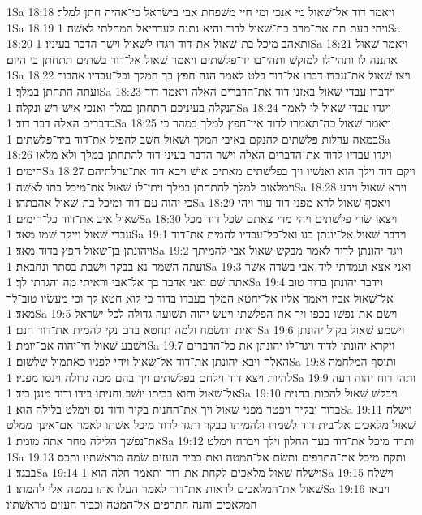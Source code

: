 1Sa 18:18  ויאמר דוד אל־שׁאול מי אנכי ומי חיי משׁפחת אבי בישׂראל כי־אהיה חתן למלך׃
1Sa 18:19  ויהי בעת תת את־מרב בת־שׁאול לדוד והיא נתנה לעדריאל המחלתי לאשׁה׃
1Sa 18:20  ותאהב מיכל בת־שׁאול את־דוד ויגדו לשׁאול וישׁר הדבר בעיניו׃
1Sa 18:21  ויאמר שׁאול אתננה לו ותהי־לו למוקשׁ ותהי־בו יד־פלשׁתים ויאמר שׁאול אל־דוד בשׁתים תתחתן בי היום׃
1Sa 18:22  ויצו שׁאול את־עבדו דברו אל־דוד בלט לאמר הנה חפץ בך המלך וכל־עבדיו אהבוך ועתה התחתן במלך׃
1Sa 18:23  וידברו עבדי שׁאול באזני דוד את־הדברים האלה ויאמר דוד הנקלה בעיניכם התחתן במלך ואנכי אישׁ־רשׁ ונקלה׃
1Sa 18:24  ויגדו עבדי שׁאול לו לאמר כדברים האלה דבר דוד׃
1Sa 18:25  ויאמר שׁאול כה־תאמרו לדוד אין־חפץ למלך במהר כי במאה ערלות פלשׁתים להנקם באיבי המלך ושׁאול חשׁב להפיל את־דוד ביד־פלשׁתים׃
1Sa 18:26  ויגדו עבדיו לדוד את־הדברים האלה וישׁר הדבר בעיני דוד להתחתן במלך ולא מלאו הימים׃
1Sa 18:27  ויקם דוד וילך הוא ואנשׁיו ויך בפלשׁתים מאתים אישׁ ויבא דוד את־ערלתיהם וימלאום למלך להתחתן במלך ויתן־לו שׁאול את־מיכל בתו לאשׁה׃
1Sa 18:28  וירא שׁאול וידע כי יהוה עם־דוד ומיכל בת־שׁאול אהבתהו׃
1Sa 18:29  ויאסף שׁאול לרא מפני דוד עוד ויהי שׁאול איב את־דוד כל־הימים׃
1Sa 18:30  ויצאו שׂרי פלשׁתים ויהי מדי צאתם שׂכל דוד מכל עבדי שׁאול וייקר שׁמו מאד׃
1Sa 19:1  וידבר שׁאול אל־יונתן בנו ואל־כל־עבדיו להמית את־דוד ויהונתן בן־שׁאול חפץ בדוד מאד׃
1Sa 19:2  ויגד יהונתן לדוד לאמר מבקשׁ שׁאול אבי להמיתך ועתה השׁמר־נא בבקר וישׁבת בסתר ונחבאת׃
1Sa 19:3  ואני אצא ועמדתי ליד־אבי בשׂדה אשׁר אתה שׁם ואני אדבר בך אל־אבי וראיתי מה והגדתי לך׃
1Sa 19:4  וידבר יהונתן בדוד טוב אל־שׁאול אביו ויאמר אליו אל־יחטא המלך בעבדו בדוד כי לוא חטא לך וכי מעשׂיו טוב־לך מאד׃
1Sa 19:5  וישׂם את־נפשׁו בכפו ויך את־הפלשׁתי ויעשׂ יהוה תשׁועה גדולה לכל־ישׂראל ראית ותשׂמח ולמה תחטא בדם נקי להמית את־דוד חנם׃
1Sa 19:6  וישׁמע שׁאול בקול יהונתן וישׁבע שׁאול חי־יהוה אם־יומת׃
1Sa 19:7  ויקרא יהונתן לדוד ויגד־לו יהונתן את כל־הדברים האלה ויבא יהונתן את־דוד אל־שׁאול ויהי לפניו כאתמול שׁלשׁום׃
1Sa 19:8  ותוסף המלחמה להיות ויצא דוד וילחם בפלשׁתים ויך בהם מכה גדולה וינסו מפניו׃
1Sa 19:9  ותהי רוח יהוה רעה אל־שׁאול והוא בביתו יושׁב וחניתו בידו ודוד מנגן ביד׃
1Sa 19:10  ויבקשׁ שׁאול להכות בחנית בדוד ובקיר ויפטר מפני שׁאול ויך את־החנית בקיר ודוד נס וימלט בלילה הוא׃
1Sa 19:11  וישׁלח שׁאול מלאכים אל־בית דוד לשׁמרו ולהמיתו בבקר ותגד לדוד מיכל אשׁתו לאמר אם־אינך ממלט את־נפשׁך הלילה מחר אתה מומת׃
1Sa 19:12  ותרד מיכל את־דוד בעד החלון וילך ויברח וימלט׃
1Sa 19:13  ותקח מיכל את־התרפים ותשׂם אל־המטה ואת כביר העזים שׂמה מראשׁתיו ותכס בבגד׃
1Sa 19:14  וישׁלח שׁאול מלאכים לקחת את־דוד ותאמר חלה הוא׃
1Sa 19:15  וישׁלח שׁאול את־המלאכים לראות את־דוד לאמר העלו אתו במטה אלי להמתו׃
1Sa 19:16  ויבאו המלאכים והנה התרפים אל־המטה וכביר העזים מראשׁתיו׃

